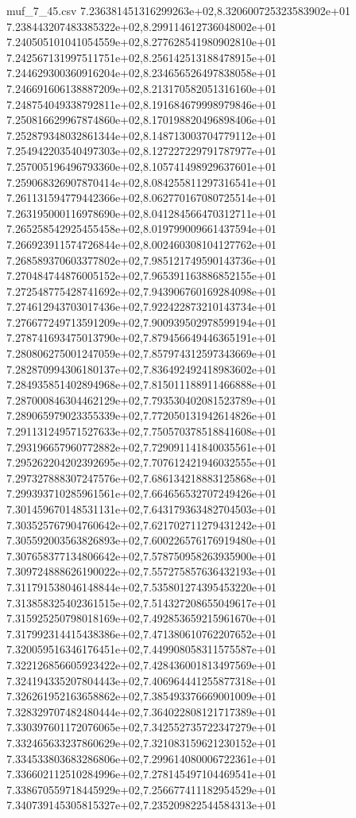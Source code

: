 \begin{filecontents*}{muf_7_45.csv}
7.236381451316299263e+02,8.320600725323583902e+01
7.238443207483385322e+02,8.299114612736048002e+01
7.240505101041054559e+02,8.277628541980902810e+01
7.242567131997511751e+02,8.256142513188478915e+01
7.244629300360916204e+02,8.234656526497838058e+01
7.246691606138887209e+02,8.213170582051316160e+01
7.248754049338792811e+02,8.191684679998979846e+01
7.250816629967874860e+02,8.170198820496898406e+01
7.252879348032861344e+02,8.148713003704779112e+01
7.254942203540497303e+02,8.127227229791787977e+01
7.257005196496793360e+02,8.105741498929637601e+01
7.259068326907870414e+02,8.084255811297316541e+01
7.261131594779442366e+02,8.062770167080725514e+01
7.263195000116978690e+02,8.041284566470312711e+01
7.265258542925455458e+02,8.019799009661437594e+01
7.266923911574726844e+02,8.002460308104127762e+01
7.268589370603377802e+02,7.985121749590143736e+01
7.270484744876005152e+02,7.965391163886852155e+01
7.272548775428741692e+02,7.943906760169284098e+01
7.274612943703017436e+02,7.922422873210143734e+01
7.276677249713591209e+02,7.900939502978599194e+01
7.278741693475013790e+02,7.879456649446365191e+01
7.280806275001247059e+02,7.857974312597343669e+01
7.282870994306180137e+02,7.836492492418983602e+01
7.284935851402894968e+02,7.815011188911466888e+01
7.287000846304462129e+02,7.793530402081523789e+01
7.289065979023355339e+02,7.772050131942614826e+01
7.291131249571527633e+02,7.750570378518841608e+01
7.293196657960772882e+02,7.729091141840035561e+01
7.295262204202392695e+02,7.707612421946032555e+01
7.297327888307247576e+02,7.686134218883125868e+01
7.299393710285961561e+02,7.664656532707249426e+01
7.301459670148531131e+02,7.643179363482704503e+01
7.303525767904760642e+02,7.621702711279431242e+01
7.305592003563826893e+02,7.600226576176919480e+01
7.307658377134806642e+02,7.578750958263935900e+01
7.309724888626190022e+02,7.557275857636432193e+01
7.311791538046148844e+02,7.535801274395453220e+01
7.313858325402361515e+02,7.514327208655049617e+01
7.315925250798018169e+02,7.492853659215961670e+01
7.317992314415438386e+02,7.471380610762207652e+01
7.320059516346176451e+02,7.449908058311575587e+01
7.322126856605923422e+02,7.428436001813497569e+01
7.324194335207804443e+02,7.406964441255877318e+01
7.326261952163658862e+02,7.385493376669001009e+01
7.328329707482480444e+02,7.364022808121717389e+01
7.330397601172076065e+02,7.342552735722347279e+01
7.332465633237860629e+02,7.321083159621230152e+01
7.334533803683286806e+02,7.299614080006722361e+01
7.336602112510284996e+02,7.278145497104469541e+01
7.338670559718445929e+02,7.256677411182954529e+01
7.340739145305815327e+02,7.235209822544584313e+01

\end{filecontents*}
